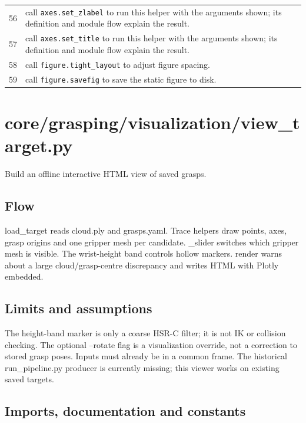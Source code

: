 \documentclass[11pt,a4paper]{book}
\begin{document}
\begin{longtable}{r p{}}
56 & call \texttt{axes.set\_zlabel} to run this helper with the arguments shown; its definition and module flow explain the result. \\

57 & call \texttt{axes.set\_title} to run this helper with the arguments shown; its definition and module flow explain the result. \\

58 & call \texttt{figure.tight\_layout} to adjust figure spacing. \\

59 & call \texttt{figure.savefig} to save the static figure to disk. \\

\end{longtable}

\chapter{core/grasping/visualization/view\_target.py}

Build an offline interactive HTML view of saved grasps.

\section*{Flow}

load\_target reads cloud.ply and grasps.yaml. Trace helpers draw points, axes, grasp origins and one gripper mesh per candidate. \_slider switches which gripper mesh is visible. The wrist-height band controls hollow markers. render warns about a large cloud/grasp-centre discrepancy and writes HTML with Plotly embedded.

\section*{Limits and assumptions}

The height-band marker is only a coarse HSR-C filter; it is not IK or collision checking. The optional --rotate flag is a visualization override, not a correction to stored grasp poses. Inputs must already be in a common frame. The historical run\_pipeline.py producer is currently missing; this viewer works on existing saved targets.

\section{Imports, documentation and constants}
\end{document}
